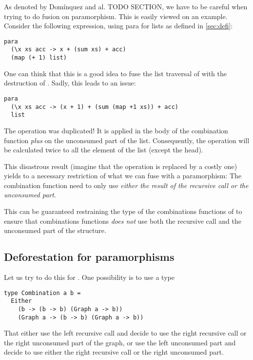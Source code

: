 As denoted by Domínquez and al. \cite{paramorphismFusion} TODO SECTION, we have to be careful when trying to do fusion on paramorphism.
This is easily viewed on an example. Consider the following expression, using para for lists as defined in \ref{sec:defi}:
\begin{verbatim}
para
  (\x xs acc -> x + (sum xs) + acc)
  (map (+ 1) list)
\end{verbatim}

One can think that this is a good idea to fuse the list traversal of  with the destruction of . Sadly, this leads to an issue:

\begin{verbatim}
para
  (\x xs acc -> (x + 1) + (sum (map +1 xs)) + acc)
  list
\end{verbatim}

The  operation was duplicated! It is applied in the body of the combination function \emph{plus} on the unconsumed part of the list. Consequently, the  operation will be calculated twice to all the element of the list (except the head).

This disastrous result (imagine that the  operation is replaced by a costly one) yields to a necessary restriction of what we can fuse with a paramorphism:
The combination function need to only use \emph{either the result of the recursive call or the unconsumed part}.

This can be guaranteed restraining the type of the combinations functions of  to ensure that combinations functions \emph{does not} use both the recursive call and the unconsumed part of the structure.

\subsection{Deforestation for paramorphisms}

Let us try to do this for .
One possibility is to use a type
\begin{verbatim}
type Combination a b =
  Either
    (b -> (b -> b) (Graph a -> b))
    (Graph a -> (b -> b) (Graph a -> b))
\end{verbatim}

That either use the left recursive call and decide to use the right recursive call or the right unconsumed part of the graph, or use the left unconsumed part and decide to use either the right recursive call or the right unconsumed part.

